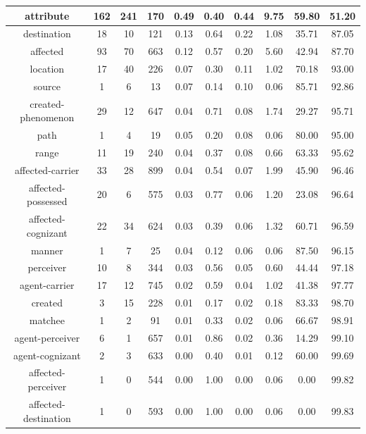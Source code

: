 \begin{table}[!ht]
{\begin{tabular}{|c|c|c|c|c|c|c|c|c|c|}
            attribute & 162 & 241 & 170 & 0.49 & 0.40 & 0.44 & 9.75 & 59.80 & 51.20 \\ \hline
            destination & 18 & 10 & 121 & 0.13 & 0.64 & 0.22 & 1.08 & 35.71 & 87.05 \\ \hline
            affected & 93 & 70 & 663 & 0.12 & 0.57 & 0.20 & 5.60 & 42.94 & 87.70 \\ \hline
            location & 17 & 40 & 226 & 0.07 & 0.30 & 0.11 & 1.02 & 70.18 & 93.00 \\ \hline
            source & 1 & 6 & 13 & 0.07 & 0.14 & 0.10 & 0.06 & 85.71 & 92.86 \\ \hline
            created-phenomenon & 29 & 12 & 647 & 0.04 & 0.71 & 0.08 & 1.74 & 29.27 & 95.71 \\ \hline
            path & 1 & 4 & 19 & 0.05 & 0.20 & 0.08 & 0.06 & 80.00 & 95.00 \\ \hline
            range & 11 & 19 & 240 & 0.04 & 0.37 & 0.08 & 0.66 & 63.33 & 95.62 \\ \hline
            affected-carrier & 33 & 28 & 899 & 0.04 & 0.54 & 0.07 & 1.99 & 45.90 & 96.46 \\ \hline
            affected-possessed & 20 & 6 & 575 & 0.03 & 0.77 & 0.06 & 1.20 & 23.08 & 96.64 \\ \hline
            affected-cognizant & 22 & 34 & 624 & 0.03 & 0.39 & 0.06 & 1.32 & 60.71 & 96.59 \\ \hline
            manner & 1 & 7 & 25 & 0.04 & 0.12 & 0.06 & 0.06 & 87.50 & 96.15 \\ \hline
            perceiver & 10 & 8 & 344 & 0.03 & 0.56 & 0.05 & 0.60 & 44.44 & 97.18 \\ \hline
            agent-carrier & 17 & 12 & 745 & 0.02 & 0.59 & 0.04 & 1.02 & 41.38 & 97.77 \\ \hline
            created & 3 & 15 & 228 & 0.01 & 0.17 & 0.02 & 0.18 & 83.33 & 98.70 \\ \hline
            matchee & 1 & 2 & 91 & 0.01 & 0.33 & 0.02 & 0.06 & 66.67 & 98.91 \\ \hline
            agent-perceiver & 6 & 1 & 657 & 0.01 & 0.86 & 0.02 & 0.36 & 14.29 & 99.10 \\ \hline
            agent-cognizant & 2 & 3 & 633 & 0.00 & 0.40 & 0.01 & 0.12 & 60.00 & 99.69 \\ \hline
            affected-perceiver & 1 & 0 & 544 & 0.00 & 1.00 & 0.00 & 0.06 & 0.00 & 99.82 \\ \hline
            affected-destination & 1 & 0 & 593 & 0.00 & 1.00 & 0.00 & 0.06 & 0.00 & 99.83 \\ \hline

\end{tabular}}
\end{table}
